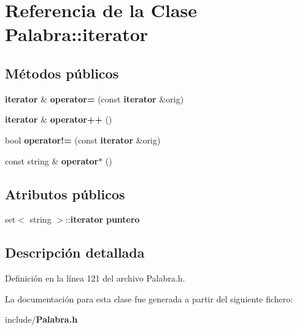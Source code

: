\section{Referencia de la Clase Palabra\-:\-:iterator}
\label{classPalabra_1_1iterator}
\subsection*{Métodos públicos}
\begin{DoxyCompactItemize}
\item 
{\bf iterator} \& {\bfseries operator=} (const {\bf iterator} \&orig)\label{classPalabra_1_1iterator_af66f29c0174df9081d7f2d791bc6d86c}

\item 
{\bf iterator} \& {\bfseries operator++} ()\label{classPalabra_1_1iterator_ae370249c2ee00a6299800e90c42fd201}

\item 
bool {\bfseries operator!=} (const {\bf iterator} \&orig)\label{classPalabra_1_1iterator_a116530b967e955c8fc8d544299f9d901}

\item 
const string \& {\bfseries operator$\ast$} ()\label{classPalabra_1_1iterator_adeb2acf8c8da7ec9811ea2eecd32ecc1}

\end{DoxyCompactItemize}
\subsection*{Atributos públicos}
\begin{DoxyCompactItemize}
\item 
set$<$ string $>$\-::{\bf iterator} {\bfseries puntero}\label{classPalabra_1_1iterator_a636195a286c1015c9beed4529c74fe38}

\end{DoxyCompactItemize}


\subsection{Descripción detallada}


Definición en la línea 121 del archivo Palabra.\-h.



La documentación para esta clase fue generada a partir del siguiente fichero\-:\begin{DoxyCompactItemize}
\item 
include/{\bf Palabra.\-h}\end{DoxyCompactItemize}
